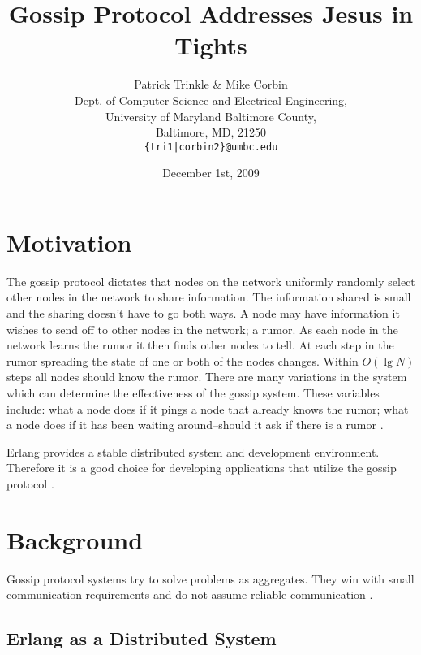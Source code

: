 \documentclass[11pt,twocolumn]{article}
\title{Gossip Protocol Addresses Jesus in Tights}
\author{Patrick Trinkle \& Mike Corbin\\
Dept. of Computer Science and Electrical Engineering,\\
University of Maryland Baltimore County,\\
Baltimore, MD, 21250\\
\texttt{\{tri1|corbin2\}@umbc.edu}}
\date{December 1st, 2009}
\begin{document}

\section{Motivation}

The gossip protocol dictates that nodes on the network uniformly
 randomly select other nodes in the network to share information.
  The information shared is small and the sharing doesn't have to
 go both ways.  A node may have information it wishes to send
 off to other nodes in the network; a rumor.  As each node in the
 network learns the rumor it then finds other nodes to tell.  At each
 step in the rumor spreading the state of one or both of the nodes
 changes.  Within $O(\lg N)$ steps all nodes should know the rumor.
  There are many variations in the system which can determine the
 effectiveness of the gossip system.  These variables include: what
 a node does if it pings a node that already knows the rumor; what
 a node does if it has been waiting around--should it ask if there is
 a rumor \cite{Birm2007}.

Erlang provides a stable distributed system and development
 environment.  Therefore it is a good choice for developing applications
 that utilize the gossip protocol \cite{Erlang}.

\section{Background}

Gossip protocol systems try to solve problems as aggregates.  They
 win with small communication requirements and do not assume reliable
 communication \cite{Birm2007}.

\subsection{Erlang as a Distributed System}
\end{document}
